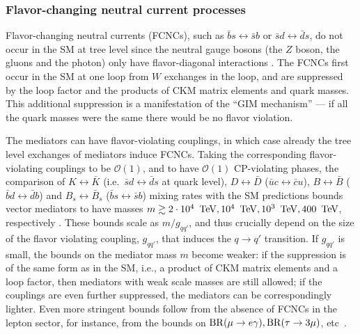 \subsubsection{Flavor-changing neutral current processes} 
Flavor-changing neutral currents (FCNCs), such as $\bar b s\leftrightarrow  \bar s b$ or $\bar s d \leftrightarrow \bar d s$, do not occur in the SM at tree level since the neutral gauge bosons (the $Z$ boson, the gluons and the photon) 
only have flavor-diagonal interactions \cite{Introduction:flavor:physics}. 
The FCNCs first occur in the SM at one loop from $W$ exchanges in the loop, and are suppressed by the loop factor and the products of CKM matrix elements and quark masses. This additional suppression is a manifestation of the ``GIM mechanism'' --- if all the quark masses were the same there would be no flavor violation.


The mediators can have flavor-violating couplings, in which case already the tree level exchanges of mediators induce FCNCs. 
Taking the corresponding flavor-violating couplings to be ${\mathcal O}(1)$, and to have ${\mathcal O}(1)$ CP-violating phases,
the comparison of $K \leftrightarrow \bar K$
(i.e.\  $\bar s  d\leftrightarrow \bar d s$ at quark level),
$D\leftrightarrow\bar D $ ($\bar u  c\leftrightarrow \bar c u$), 
$B\leftrightarrow\bar B $ ($\bar b  d\leftrightarrow \bar d b$) and 
$B_s\leftrightarrow\bar B_s $ ($\bar b s  \leftrightarrow \bar s b$)
mixing rates with the SM predictions bounds vector mediators to have masses $m \gtrsim 2 \cdot 10^{4}\, {\rm~TeV}, 10^4\,{\rm~TeV},10^3\,{\rm~TeV}, 400\,{\rm~TeV}$, respectively \cite{FCNC:bounds}.
These bounds scale as $m/g_{qq'}$, and thus crucially depend  on the size of the flavor violating coupling, $g_{qq'}$, that induces the $q\to q'$ transition. If $g_{qq'}$ is small, the bounds on the mediator mass $m$ become weaker: if the suppression is of the same form as in the SM, i.e., a product of CKM matrix elements and a loop factor, then mediators with weak scale masses are still allowed; if the couplings are even further suppressed, the mediators can be correspondingly lighter. Even more stringent bounds follow from the absence of FCNCs in the lepton sector, for instance, from the bounds on ${\rm BR}(\mu \to e \gamma), {\rm BR}(\tau\to 3\mu)$, etc~\cite{FCNC:bounds}.

